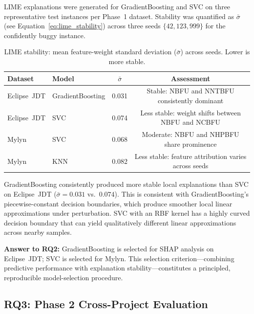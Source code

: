 \documentclass[12pt, a4paper]{article}
\newcommand{\RQ}[1]{\textbf{RQ#1}}
\newcommand{\model}[1]{\textsf{#1}}
\begin{document}
LIME explanations were generated for \model{GradientBoosting} and \model{SVC}
on three representative test instances per Phase~1 dataset. Stability was
quantified as $\bar{\sigma}$ (see Equation~\eqref{eq:lime_stability}) across
three seeds $\{42, 123, 999\}$ for the confidently buggy instance.

\begin{table}[H]
\caption{LIME stability: mean feature-weight standard deviation ($\bar{\sigma}$)
across seeds. Lower is more stable.}
\label{tab:lime_stability}
\centering
\small
\renewcommand{\arraystretch}{1.2}
\begin{tabular}{@{}llcc@{}}
\toprule
\textbf{Dataset} & \textbf{Model}
  & \textbf{$\bar{\sigma}$} & \textbf{Assessment} \\
\midrule
Eclipse~JDT & GradientBoosting & 0.031 & Stable: NBFU and NNTBFU consistently dominant \\
Eclipse~JDT & SVC              & 0.074 & Less stable: weight shifts between NBFU and NCBFU \\
Mylyn       & SVC              & 0.068 & Moderate: NBFU and NHPBFU share prominence \\
Mylyn       & KNN              & 0.082 & Less stable: feature attribution varies across seeds \\
\bottomrule
\end{tabular}
\end{table}

\model{GradientBoosting} consistently produced more stable local explanations
than \model{SVC} on Eclipse~JDT ($\bar{\sigma} = 0.031$ vs.\ $0.074$). This
is consistent with \model{GradientBoosting}'s piecewise-constant decision
boundaries, which produce smoother local linear approximations under
perturbation. \model{SVC} with an RBF kernel has a highly curved decision
boundary that can yield qualitatively different linear approximations across
nearby samples.

\noindent\textbf{Answer to \RQ{2}:} \model{GradientBoosting} is selected for
SHAP analysis on Eclipse~JDT; \model{SVC} is selected for Mylyn. This
selection criterion---combining predictive performance with explanation
stability---constitutes a principled, reproducible model-selection procedure.

\subsection{RQ3: Phase 2 Cross-Project Evaluation}
\end{document}
